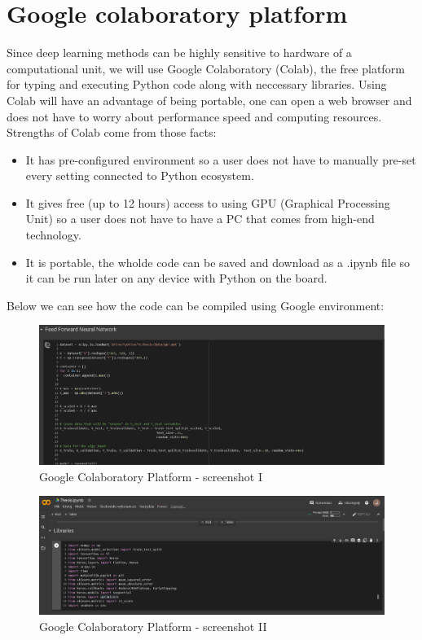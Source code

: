 \documentclass[a4paper,oneside,openright,11pt]{book}
\begin{document}
\section{Google colaboratory platform}

Since deep learning methods can be highly sensitive to hardware of a computational unit, we will use Google Colaboratory (Colab), the free platform for typing and executing Python code along with neccessary libraries. Using Colab will have an advantage of being portable, one can open a web browser and does not have to worry about performance speed and computing resources. Strengths of Colab come from those facts:

\begin{itemize}
    \item It has pre-configured environment so a user does not have to manually pre-set every setting connected to Python ecosystem.
    \item It gives free (up to 12 hours) access to using GPU (Graphical Processing Unit) so a user does not have to have a PC that comes from high-end technology.
    \item It is portable, the wholde code can be saved and download as a .ipynb file so it can be run later on any device with Python on the board.
\end{itemize}


Below we can see how the code can be compiled using Google environment:

\begin{figure}[h!]
\centering
\includegraphics[scale=0.4]{DocumentFigures/MyFigures/feedforwardenvir.png}
\caption{Google Colaboratory Platform - screenshot I}
\end{figure}

\begin{figure}[h!]
\centering
\includegraphics[scale=0.4]{DocumentFigures/MyFigures/ImpotLibrariesEnvir.png}
\caption{Google Colaboratory Platform - screenshot II}
\end{figure}
\end{document}
